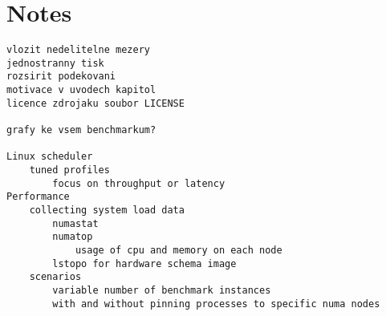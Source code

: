 \chapter{Notes}
\begin{verbatim}
vlozit nedelitelne mezery
jednostranny tisk
rozsirit podekovani
motivace v uvodech kapitol
licence zdrojaku soubor LICENSE

grafy ke vsem benchmarkum?

Linux scheduler
    tuned profiles
        focus on throughput or latency
Performance
    collecting system load data
        numastat
        numatop
            usage of cpu and memory on each node
        lstopo for hardware schema image
    scenarios
        variable number of benchmark instances
        with and without pinning processes to specific numa nodes
\end{verbatim}